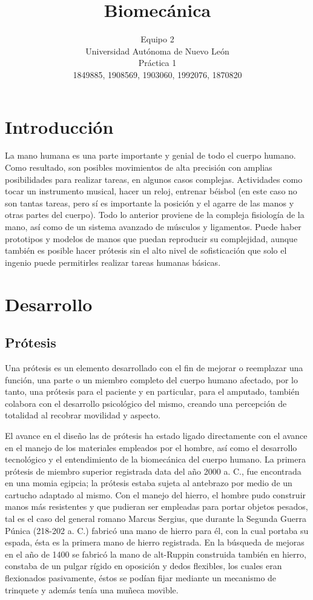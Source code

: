 \documentclass[a4paper]{article}
\title{Biomecánica}
\author{Equipo 2\\
  \small Universidad Autónoma de Nuevo León\\
  \small Práctica 1\\
  \small 1849885, 1908569, 1903060, 1992076, 1870820\\
  \date{}
}
\begin{document}
\maketitle

\section{Introducci\'on}
La mano humana es una parte importante y genial de todo el cuerpo humano. Como resultado, son posibles movimientos de alta precisión con amplias posibilidades para realizar tareas, en algunos casos complejas. Actividades como tocar un instrumento musical, hacer un reloj, entrenar béisbol (en este caso no son tantas tareas, pero sí es importante la posición y el agarre de las manos y otras partes del cuerpo). Todo lo anterior proviene de la compleja fisiología de la mano, así como de un sistema avanzado de músculos y ligamentos. Puede haber prototipos y modelos de manos que puedan reproducir su complejidad, aunque también es posible hacer prótesis sin el alto nivel de sofisticación que solo el ingenio puede permitirles realizar tareas humanas básicas. 


\section{Desarrollo}
\subsection{Prótesis}
Una prótesis es un elemento desarrollado con el fin de mejorar o reemplazar una función, una parte o un miembro completo del cuerpo humano afectado, por lo tanto, una prótesis para el paciente y en particular, para el amputado, también colabora con el desarrollo psicológico del mismo, creando una percepción de totalidad al recobrar movilidad y aspecto. 

El avance en el diseño las de prótesis ha estado ligado directamente con el avance en el manejo de los materiales empleados por el hombre, así como el desarrollo tecnológico y el entendimiento de la biomecánica del cuerpo humano. La primera prótesis de miembro superior registrada data del año 2000 a. C., fue encontrada en una momia egipcia; la prótesis estaba sujeta al antebrazo por medio de un cartucho adaptado al mismo. Con el manejo del hierro, el hombre pudo construir manos más resistentes y que pudieran ser empleadas para portar objetos pesados, tal es el caso del general romano Marcus Sergius, que durante la Segunda Guerra Púnica (218-202 a. C.) fabricó una mano de hierro para él, con la cual portaba su espada, ésta es la primera mano de hierro registrada. En la búsqueda de mejoras en el año de 1400 se fabricó la mano de alt-Ruppin construida también en hierro, constaba de un pulgar rígido en oposición y dedos flexibles, los cuales eran flexionados pasivamente, éstos se podían fijar mediante un mecanismo de trinquete y además tenía una muñeca movible. 
\end{document}
